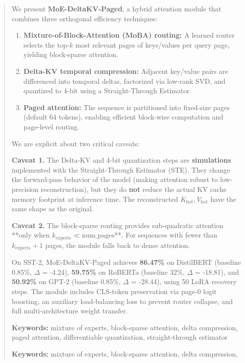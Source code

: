 \documentclass{article}
\begin{document}
\maketitle

\begin{abstract}
We present \textbf{MoE-DeltaKV-Paged}, a hybrid attention module that combines 
three orthogonal efficiency techniques:

\begin{enumerate}
\item \textbf{Mixture-of-Block-Attention (MoBA) routing:} A learned router selects
  the top-$k$ most relevant pages of keys/values per query page, yielding
  block-sparse attention.
\item \textbf{Delta-KV temporal compression:} Adjacent key/value pairs are differenced
  into temporal deltas, factorized via low-rank SVD, and quantized to
  4-bit using a Straight-Through Estimator.
\item \textbf{Paged attention:} The sequence is partitioned into fixed-size pages
  (default 64 tokens), enabling efficient block-wise computation and
  page-level routing.

\end{enumerate}
We are explicit about two critical caveats:

\textbf{Caveat 1.} The Delta-KV and 4-bit quantization steps are \textbf{simulations} 
implemented with the Straight-Through Estimator (STE). They change the 
forward-pass behavior of the model (making attention robust to low-precision 
reconstruction), but they do \textbf{not} reduce the actual KV cache memory 
footprint at inference time. The reconstructed $K_\text{hat}, V_\text{hat}$ 
have the same shape as the original.

\textbf{Caveat 2.} The block-sparse routing provides sub-quadratic attention **only 
when $k_\text{experts} \ll \text{num\_pages}$**. For sequences with fewer than 
$k_\text{experts} + 1$ pages, the module falls back to dense attention.

On SST-2, MoE-DeltaKV-Paged achieves \textbf{86.47\%} on DistilBERT 
(baseline 0.85\%, $\Delta$ = -4.24), \textbf{59.75\%} on RoBERTa (baseline 
32\%, $\Delta$ = -18.81), and \textbf{50.92\%} on GPT-2 (baseline 
0.85\%, $\Delta$ = -28.44), using 50 LoRA recovery steps. 
The module includes CLS-token preservation via page-0 logit boosting, an 
auxiliary load-balancing loss to prevent router collapse, and full multi-architecture weight transfer.

\textbf{Keywords:} mixture of experts, block-sparse attention, delta compression, 
paged attention, differentiable quantization, straight-through estimator



\vspace{0.5em}
\noindent\textbf{Keywords:} mixture of experts, block-sparse attention, delta compression,
\end{abstract}
\end{document}
